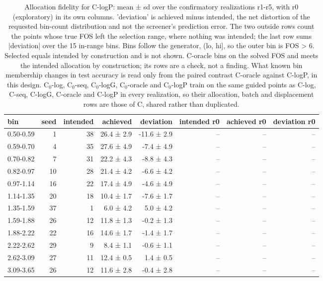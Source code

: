 \begin{table}[htbp]
\centering
\small
\setlength{\tabcolsep}{4pt}
\caption{Allocation fidelity for C-logP: mean ± sd over the confirmatory realizations r1-r5, with r0 (exploratory) in its own columns. 'deviation' is achieved minus intended, the net distortion of the requested bin-count distribution and not the screener's prediction error. The two outside rows count the points whose true FOS left the selection range, where nothing was intended; the last row sums |deviation| over the 15 in-range bins. Bins follow the generator, (lo, hi], so the outer bin is FOS > 6. Selected equals intended by construction and is not shown. C-oracle bins on the solved FOS and meets the intended allocation by construction; its rows are a check, not a finding. What known bin membership changes in test accuracy is read only from the paired contrast C-oracle against C-logP, in this design. C$_0$-log, C$_0$-seq, C$_0$-logG, C$_0$-oracle and C$_0$-logP train on the same guided points as C-log, C-seq, C-logG, C-oracle and C-logP in every realization, so their allocation, batch and displacement rows are those of C, shared rather than duplicated.}
\label{tab:structural:allocation:c-logp}
\begin{tabular}{lrrrrrrr}
\toprule
bin & seed & intended & achieved & deviation & intended r0 & achieved r0 & deviation r0 \\
\midrule
0.50-0.59 & 1 & 38 & 26.4 ± 2.9 & -11.6 ± 2.9 & -- & -- & -- \\
0.59-0.70 & 4 & 35 & 27.6 ± 4.9 & -7.4 ± 4.9 & -- & -- & -- \\
0.70-0.82 & 7 & 31 & 22.2 ± 4.3 & -8.8 ± 4.3 & -- & -- & -- \\
0.82-0.97 & 10 & 28 & 21.4 ± 4.2 & -6.6 ± 4.2 & -- & -- & -- \\
0.97-1.14 & 16 & 22 & 17.4 ± 4.9 & -4.6 ± 4.9 & -- & -- & -- \\
1.14-1.35 & 20 & 18 & 10.4 ± 1.7 & -7.6 ± 1.7 & -- & -- & -- \\
1.35-1.59 & 37 & 1 & 6.0 ± 4.2 & 5.0 ± 4.2 & -- & -- & -- \\
1.59-1.88 & 26 & 12 & 11.8 ± 1.3 & -0.2 ± 1.3 & -- & -- & -- \\
1.88-2.22 & 22 & 16 & 14.6 ± 1.7 & -1.4 ± 1.7 & -- & -- & -- \\
2.22-2.62 & 29 & 9 & 8.4 ± 1.1 & -0.6 ± 1.1 & -- & -- & -- \\
2.62-3.09 & 27 & 11 & 12.4 ± 0.5 & 1.4 ± 0.5 & -- & -- & -- \\
3.09-3.65 & 26 & 12 & 11.6 ± 2.8 & -0.4 ± 2.8 & -- & -- & -- \\

\end{tabular}
\end{table}
